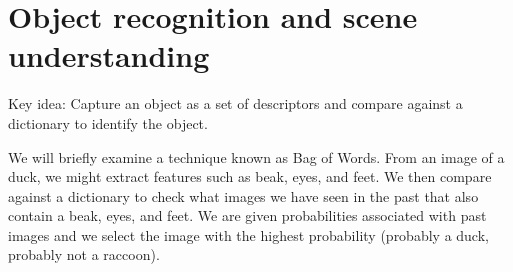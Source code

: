 \documentclass[twoside]{article}
\begin{document}
%
%
%
%


\section{Object recognition and scene understanding}
Key idea: Capture an object as a set of descriptors and compare against a dictionary to identify the object.

We will briefly examine a technique known as Bag of Words. From an image of a duck, we might extract features such as beak, eyes, and feet. We then compare against a dictionary to check what images we have seen in the past that also contain a beak, eyes, and feet. We are given probabilities associated with past images and we select the image with the highest probability (probably a duck, probably not a raccoon).
\end{document}
